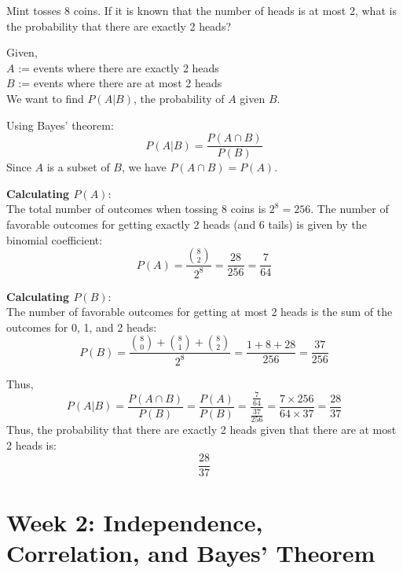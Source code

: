 \documentclass[a4paper, 10pt]{article}
\begin{document}
\begin{problem}
Mint tosses 8 coins. If it is known that the number of heads is at most 2,
what is the probability that there are exactly 2 heads?
\end{problem}

\begin{solution}
Given, \\
\(A\) := events where there are exactly 2 heads \\
\(B\) := events where there are at most 2 heads \\
We want to find \(P(A|B)\), the probability of \(A\) given \(B\).
\\
\par Using Bayes' theorem:
\[
P(A|B) = \frac{P(A \cap B)}{P(B)}
\]
Since \(A\) is a subset of \(B\), we have \(P(A \cap B) = P(A)\).
\\
\par\textbf{Calculating \(P(A)\)}: \\
The total number of outcomes when tossing 8 coins is \(2^8 = 256\).
The number of favorable outcomes for getting exactly 2 heads (and 6 tails) is given by the binomial coefficient:
\[
P(A) = \frac{\binom{8}{2}}{2^8} = \frac{28}{256} = \frac{7}{64}
\]

\par\textbf{Calculating \(P(B)\)}: \\
The number of favorable outcomes for getting at most 2 heads is the sum of the outcomes for 0, 1, and 2 heads:
\[
P(B) = \frac{\binom{8}{0} + \binom{8}{1} + \binom{8}{2}}{2^8} = \frac{1 + 8 + 28}{256} = \frac{37}{256}
\]

\par Thus,
\[
P(A|B) = \frac{P(A \cap B)}{P(B)} = \frac{P(A)}{P(B)} = \frac{\frac{7}{64}}{\frac{37}{256}} = \frac{7 \times 256}{64 \times 37} = \frac{28}{37}
\]
Thus, the probability that there are exactly 2 heads given that there are at most 2 heads is:
\[
\boxed{\frac{28}{37}}
\]
\end{solution}



\pagebreak
\section{Week 2: Independence, Correlation, and Bayes' Theorem}
\end{document}
